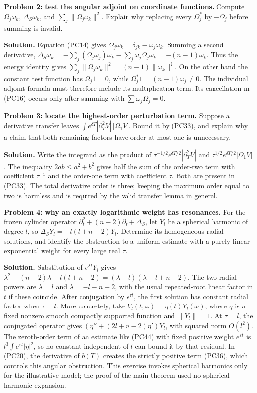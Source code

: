 \documentclass[
  11pt,
]{article}
\begin{document}
\textbf{Problem 2: test the angular adjoint on coordinate functions.}
Compute \(\Omega_j\omega_k\), \(\Delta_S\omega_k\), and
\(\sum_j\|\Omega_j\omega_k\|^2\). Explain why replacing every
\(\Omega_j^*\) by \(-\Omega_j\) before summing is invalid.

\textbf{Solution.} Equation (PC14) gives
\(\Omega_j\omega_k=\delta_{jk}-\omega_j\omega_k\). Summing a second
derivative,
\(\Delta_S\omega_k=-\sum_j(\Omega_j\omega_j)\omega_k-\sum_j\omega_j\Omega_j\omega_k=-(n-1)\omega_k\).
Thus the energy identity gives
\(\sum_j\|\Omega_j\omega_k\|^2=(n-1)\|\omega_k\|^2\). On the other hand
the constant test function has \(\Omega_j1=0\), while
\(\Omega_j^*1=(n-1)\omega_j\ne0\). The individual adjoint formula must
therefore include its multiplication term. Its cancellation in (PC16)
occurs only after summing with \(\sum\omega_j\Omega_j=0\).

\textbf{Problem 3: locate the highest-order perturbation term.} Suppose
a derivative transfer leaves
\(\int e^{\delta T}|\partial_T^2V|\,|\Omega_1V|\). Bound it by (PC33),
and explain why a claim that both remaining factors have order at most
one is unnecessary.

\textbf{Solution.} Write the integrand as the product of
\(\tau^{-1/2}e^{\delta T/2}|\partial_T^2V|\) and
\(\tau^{1/2}e^{\delta T/2}|\Omega_1V|\). The inequality
\(2ab\leq a^2+b^2\) gives half the sum of the order-two term with
coefficient \(\tau^{-1}\) and the order-one term with coefficient
\(\tau\). Both are present in (PC33). The total derivative order is
three; keeping the maximum order equal to two is harmless and is
required by the valid transfer lemma in general.

\textbf{Problem 4: why an exactly logarithmic weight has resonances.}
For the frozen cylinder operator
\(\partial_t^2+(n-2)\partial_t+\Delta_S\), let \(Y_l\) be a spherical
harmonic of degree \(l\), so \(\Delta_SY_l=-l(l+n-2)Y_l\). Determine its
homogeneous radial solutions, and identify the obstruction to a uniform
estimate with a purely linear exponential weight for every large real
\(\tau\).

\textbf{Solution.} Substitution of \(e^{\lambda t}Y_l\) gives
\(\lambda^2+(n-2)\lambda-l(l+n-2)=(\lambda-l)(\lambda+l+n-2)\). The two
radial powers are \(\lambda=l\) and \(\lambda=-l-n+2\), with the usual
repeated-root linear factor in \(t\) if these coincide. After
conjugation by \(e^{\tau t}\), the first solution has constant radial
factor when \(\tau=l\). More concretely, take
\(V_l(t,\omega)=\eta(t)Y_l(\omega)\), where \(\eta\) is a fixed nonzero
smooth compactly supported function and \(\|Y_l\|=1\). At \(\tau=l\),
the conjugated operator gives \((\eta''+(2l+n-2)\eta')Y_l\), with
squared norm \(O(l^2)\). The zeroth-order term of an estimate like
(PC44) with fixed positive weight \(e^{\varepsilon t}\) is
\(l^3\int e^{\varepsilon t}|\eta|^2\), so no constant independent of
\(l\) can bound it by that residual. In (PC20), the derivative of
\(b(T)\) creates the strictly positive term (PC36), which controls this
angular obstruction. This exercise invokes spherical harmonics only for
the illustrative model; the proof of the main theorem used no spherical
harmonic expansion.
\end{document}
